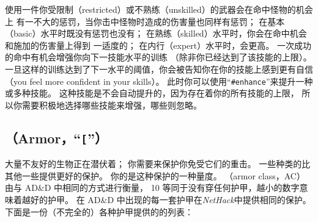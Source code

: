 \documentclass[a4paper, 10pt]{article}
\begin{document}
使用一件你受限制（restricted）或不熟练（unskilled）的武器会在命中怪物的机会上
有一不大的惩罚，当你击中怪物时造成的伤害量也同样有惩罚；
在基本（basic）水平时既没有惩罚也没有\zhTransBonuses；
在熟练（skilled）水平时，你会在命中机会和施加的伤害量上得到
一适度的\zhTransBonuses；
在内行（expert）水平时，\zhTransBonuses{}会更高。
一次成功的命中有机会增强你向下一技能水平的训练
（除非你已经达到了该技能的上限）。
一旦这样的训练达到了下一水平的阈值，你会被告知你在你的技能上感到更有自信
（you feel more confident in your skills）。
此时你可以使用“{\tt \#enhance}”来提升一种或多种技能。
这种技能是不会自动提升的，因为存在着你的所有技能的上限，
所以你需要积极地选择哪些技能来增强，哪些则忽略。

\subsection*{\zhTransArmor{}（Armor，“{\tt [}”）}

大量不友好的生物正在潜伏着；
你需要\zhTransArmor{}来保护你免受它们的重击。
一些种类的\zhTransArmor{}比其他一些提供更好的保护。
你的\zhTransArmorClass{}是这种保护的一种量度。
\zhTransArmorClass（armor class，AC）由与 AD\&D 中相同的方式进行衡量，
10 等同于没有穿任何护甲，越小的数字意味着越好的护甲。
在 AD\&D 中出现的每一套护甲在{\it NetHack}中提供相同的保护。
下面是一份（不完全的）各种护甲提供的\zhTransArmorClass{}的列表：
\end{document}
